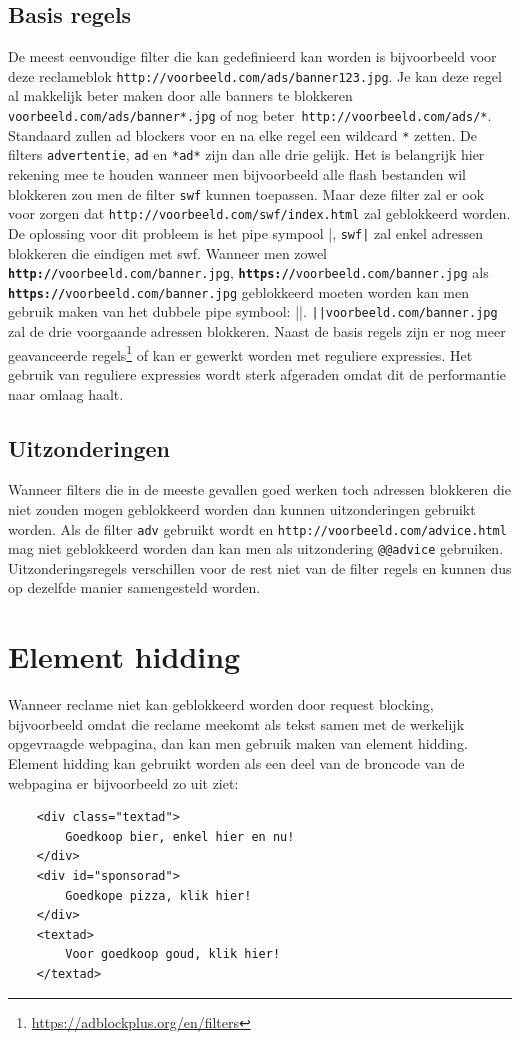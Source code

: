 \documentclass[pdftex,a4paper,12pt,twoside]{report}
\begin{document}
\subsection{Basis regels}
\label{sec Basis regels}
De meest eenvoudige filter die kan gedefinieerd kan worden is bijvoorbeeld voor deze reclameblok \texttt{http://voorbeeld.com/ads/banner123.jpg}. Je kan deze regel al makkelijk beter maken door alle banners te blokkeren \texttt{voorbeeld.com/ads/banner*.jpg} of nog beter\texttt{ http://voorbeeld.com/ads/*}. Standaard zullen ad blockers voor en na elke regel een wildcard \texttt{*} zetten. De filters \texttt{advertentie}, \texttt{ad} en \texttt{*ad*} zijn dan alle drie gelijk. Het is belangrijk hier rekening mee te houden wanneer men bijvoorbeeld alle flash bestanden wil blokkeren zou men de filter \texttt{swf} kunnen toepassen. Maar deze filter zal er ook voor zorgen dat \texttt{http://voorbeeld.com/swf/index.html} zal geblokkeerd worden. De oplossing voor dit probleem is het pipe sympool |, \texttt{swf|} zal enkel adressen blokkeren die eindigen met swf. Wanneer men zowel \texttt{\textbf{http://}voorbeeld.com/banner.jpg}, \texttt{\textbf{https://}voorbeeld.com/banner.jpg} als \texttt{\textbf{https://}voorbeeld.com/banner.jpg} geblokkeerd moeten worden kan men gebruik maken van het dubbele pipe symbool: ||. \texttt{||voorbeeld.com/banner.jpg} zal de drie voorgaande adressen blokkeren.
Naast de basis regels zijn er nog meer geavanceerde regels\footnote{\url{https://adblockplus.org/en/filters}} of kan er gewerkt worden met reguliere expressies. Het gebruik van reguliere expressies wordt sterk afgeraden omdat dit de performantie naar omlaag haalt.
\subsection{Uitzonderingen}
\label{sec Uitzonderingen}
Wanneer filters die in de meeste gevallen goed werken toch adressen blokkeren die niet zouden mogen geblokkeerd worden dan kunnen uitzonderingen gebruikt worden. Als de filter \texttt{adv} gebruikt wordt en \texttt{http://voorbeeld.com/advice.html} mag niet geblokkeerd worden dan kan men als uitzondering \texttt{@@advice} gebruiken. Uitzonderingsregels verschillen voor de rest niet van de filter regels en kunnen dus op dezelfde manier samengesteld worden.
\section{ Element hidding}
\label{sec:Element hidding}
Wanneer reclame niet kan geblokkeerd worden door request blocking, bijvoorbeeld omdat die reclame meekomt als tekst samen met de werkelijk opgevraagde webpagina, dan kan men gebruik maken van element hidding. Element hidding kan gebruikt worden als een deel van de broncode van de webpagina er bijvoorbeeld zo uit ziet:
\lstset{language=Html,tabsize=2}  
\begin{lstlisting}
	<div class="textad">
		Goedkoop bier, enkel hier en nu!
	</div>
	<div id="sponsorad">
		Goedkope pizza, klik hier!
	</div>
	<textad>
		Voor goedkoop goud, klik hier!
	</textad>
\end{lstlisting}
\end{document}
